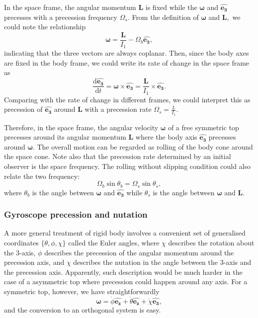 \documentclass{article}
\begin{document}
In the space frame, the angular momentum $\mathbf{L}$ is fixed while the $\boldsymbol{\mathbf{\omega}} $ and $\hat{\mathbf{e_3}}$ precesses with a precession frequency $\Omega_s.$ From the definition of $\boldsymbol{\mathbf{\omega}} $ and $\mathbf{L},$ we could note the relationship 
\[
    \boldsymbol{\mathbf{\omega}} = \frac{\mathbf{L}}{I_1} - \Omega_b \hat{\mathbf{e_3}},  
\]
indicating that the three vectors are always coplanar. Then, since the body axes are fixed in the body frame, we could write its rate of change in the space frame as 
\[
    \frac{\mathrm{d}\hat{\mathbf{e_3} }}{\mathrm{d}t} = 
    \boldsymbol{\mathbf{\omega}} \times \hat{\mathbf{e_3} }
    = \frac{\mathbf{L} }{I_1} \times \hat{\mathbf{e_3} }.
\]
Comparing with the rate of change in different frames, we could interpret this as precession of $\hat{\mathbf{e_3} }$ around $\mathbf{L}$ with a precession rate $\boxed{\Omega_s = \frac{L}{I_1}}.$

Therefore, in the space frame, the angular velocity $\boldsymbol{\mathbf{\omega}} $ of a free symmetric top precesses around its angular momentum $\mathbf{L} $ where the body axis $\hat{\mathbf{e_3} }$ precesses around $\boldsymbol{\mathbf{\omega}}.$ The overall motion can be regarded as rolling of the body cone around the space cone. Note also that the precession rate determined by an initial observer is the space frequency. The rolling without slipping condition could also relate the two frequency:
\[
    \Omega_b \sin{\theta_b} = \Omega_s \sin{\theta_s},
\]
where $\theta_b$ is the angle between $\boldsymbol{\mathbf{\omega}}$ and $\hat{\mathbf{e_3} }$ while $\theta_s$ is the angle between $\boldsymbol{\mathbf{\omega}}$ and $\mathbf{L}.$ 

\subsubsection{Gyroscope precession and nutation}
A more general treatment of rigid body involves a convenient set of generalised coordinates $\{\theta, \phi, \chi\}$ called the Euler angles, where $\chi$ describes the rotation about the 3-axis, $\phi$ describes the precession of the angular momentum around the precession axis, and $\chi$ describes the nutation in the angle between the 3-axis and the precession axis. Apparently, such description would be much harder in the case of a asymmetric top where precession could happen around any axis. For a symmetric top, however, we have straightforwardly 
\[
    \boldsymbol{\mathbf{\omega}} = \dot{\phi} \hat{\mathbf{e_z}} + \dot{\theta} \hat{\mathbf{e_z}} + \dot{\chi } \hat{\mathbf{e_3}}, 
\]
and the conversion to an orthogonal system is easy. 
\end{document}
